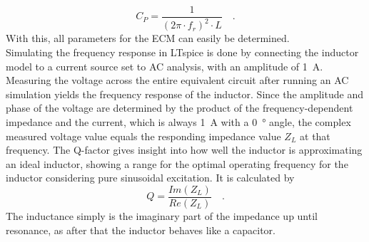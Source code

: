 \begin{equation}\label{eq:ecm_capacitance}
    C_P = \frac{1}{\left(2 \pi \cdot f_r\right)^2\cdot L} \quad\text{.}
\end{equation}
With this, all parameters for the \ac{ECM} can easily be determined.\\
Simulating the frequency response in LTspice is done by connecting the inductor model to a current source set to \ac{AC} analysis, with an amplitude of \SI{1}{A}. Measuring the voltage across the entire equivalent circuit after running an \ac{AC} simulation yields the frequency response of the inductor. Since the amplitude and phase of the voltage are determined by the product of the frequency-dependent impedance and the current, which is always \SI{1}{A} with a \SI{0}{\degree} angle, the complex measured voltage value equals the responding impedance value $Z_L$ at that frequency. The \ac{Q-factor} gives insight into how well the inductor is approximating an ideal inductor, showing a range for the optimal operating frequency for the inductor considering pure sinusoidal excitation. It is calculated by
\begin{equation}
    Q = \frac{Im(Z_L)}{Re(Z_L)} \quad\text{.} 
\end{equation}
The inductance simply is the imaginary part of the impedance up until resonance, as after that the inductor behaves like a capacitor. 
